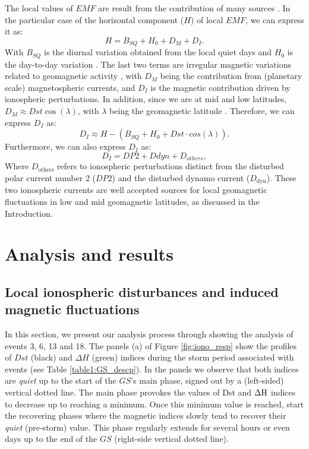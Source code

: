 \documentclass[a4paper,fleqn]{cas-dc}
\begin{document}
The local values of $EMF$ are result from the contribution of many sources \citep{1969intro_to_iono_p, l_handbook_geof_sw_Geom_field,  baseline_Gjerloev, vanKampt}. In the particular case of the horizontal component ($H$) of local $EMF$, we can express it as:
\begin{equation}
    \label{eq:1}
    H = B_{SQ} + H_0 + D_{M} + D_{I}.
\end{equation}
With $B_{SQ}$ is the diurnal variation obtained from the local quiet days \citep{vanKampt} and $H_0$ is the day-to-day variation \citep{baseline_Gjerloev, vanKampt}. The last two terms are irregular magnetic variations related to geomagnetic activity \citep{ddyn2005, angeoddyn}, with $D_M$ being the contribution from (planetary scale) magnetospheric currents, and $D_I$ is the magnetic contribution driven by ionospheric perturbations. In addition, since we are at mid and low latitudes, $D_M \approx Dst \cos(\lambda)$, with $\lambda$ being the geomagnetic latitude \citep{amorymazaudier_2017}. Therefore, we can express $D_I$ as: 
\begin{equation}
\label{eq:diono}
   D_{I} \approx H -(B_{SQ} +  H_0 + Dst \cdot cos(\lambda)).
\end{equation}
Furthermore, we can also express $D_{I}$ as:
\begin{equation}
\label{eq:diono_explicit}
   D_{I} = DP2 + Ddyn + D_{others},
\end{equation}
Where $D_{\text{others}}$ refers to ionospheric perturbations distinct from the disturbed polar current number 2 ($DP2$) and the disturbed dynamo current ($D_{\text{dyn}}$). These two ionospheric currents are well accepted sources for local geomagnetic fluctuations in low and mid geomagnetic latitudes, as discussed in the Introduction.


\section{Analysis and results}
\label{results}

\subsection{Local ionospheric disturbances and induced magnetic fluctuations}
\label{analysis}
In this section, we present our analysis process through showing the analysis of events 3, 6, 13 and 18. The panels (a) of Figure \ref{fig:iono_resp} show the profiles of $Dst$ (black) and $\Delta H$ (green) indices during the storm period associated with events (see Table \ref{table1:GS_descp}). In the panels we observe that both indices are \emph{quiet} up to the start of the $GS$'s main phase, signed out by a (left-sided) vertical dotted line. The main phase provokes the values of Dst and $\Delta {\rm H}$ indices to decrease up to reaching a minimum. Once this minimum value is reached, start the recovering phases where the magnetic indices slowly tend to recover their \emph{quiet} (pre-storm) value. This phase regularly extends for several hours or even days up to the end of the $GS$ (right-side vertical dotted line).  
\end{document}
